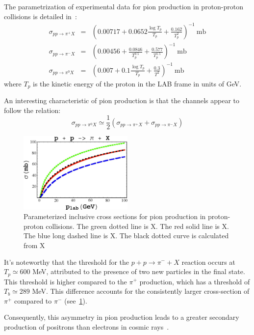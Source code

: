 The parametrization of experimental data for pion production in proton-proton collisions is detailed in~\cite{Norbury2009nimpb}:
%
\begin{eqnarray*}
\sigma_{pp\rightarrow \pi^+ X} & = & \left( 0.00717 + 0.0652 \frac{\log T_p}{T_p} + \frac{0.162}{T_p^2} \right)^{-1}~\text{mb} \\
\sigma_{pp\rightarrow \pi^- X} & = & \left( 0.00456 + \frac{0.0846}{T_p^{0.5}} + \frac{0.577}{T_p^{1.5}} \right)^{-1}~\text{mb} \\
\sigma_{pp\rightarrow \pi^0 X} & = & \left( 0.007 + 0.1 \frac{\log T_p}{T_p} + \frac{0.3}{T^2} \right)^{-1}~\text{mb} 
\end{eqnarray*}
%
where $T_p$ is the kinetic energy of the proton in the LAB frame in units of GeV.

An interesting characteristic of pion production is that the channels appear to follow the relation:
%
\[ 
\sigma_{pp\rightarrow \pi^0 X}  \simeq \frac{1}{2} (\sigma_{pp\rightarrow \pi^+ X}  + \sigma_{pp\rightarrow \pi^- X}) 
\]

\begin{figure}[t]
\centering
\includegraphics[width=0.5\textwidth]{figures/Norbury2009.jpg}
\caption{Parameterized inclusive cross sections for pion production in proton-proton collisions. The green dotted line is X. The red solid line is X. The blue long dashed line is X. The black dotted curve is calculated from X~\cite{Norbury2009nimpb}}
\label{fig:pionprod}
\end{figure}

It's noteworthy that the threshold for the \( p+p \rightarrow \pi^- + X \) reaction occurs at \( T_p \simeq 600 \) MeV, attributed to the presence of two new particles in the final state. This threshold is higher compared to the \( \pi^+ \) production, which has a threshold of \( T_b \simeq 289 \) MeV. This difference accounts for the consistently larger cross-section of \( \pi^+ \) compared to \( \pi^- \) (see~\cref{fig:pionprod}).

Consequently, this asymmetry in pion production leads to a greater secondary production of positrons than electrons in cosmic rays~\cite{Moskalenko1998apj}.

